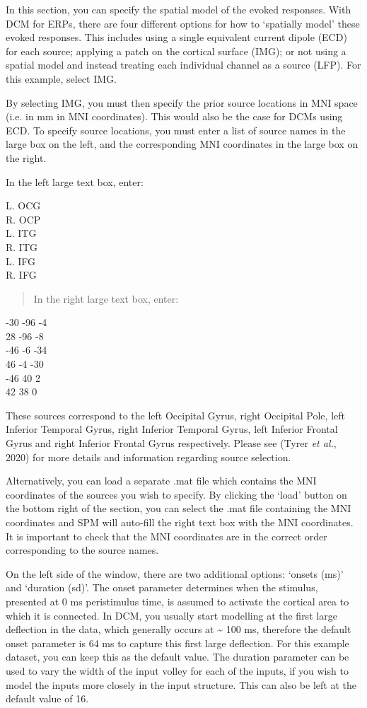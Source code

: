 In this section, you can specify the spatial model of the evoked
responses. With DCM for ERPs, there are four different options for how
to `spatially model' these evoked responses. This includes using a
single equivalent current dipole (ECD) for each source; applying a patch
on the cortical surface (IMG); or not using a spatial model and instead
treating each individual channel as a source (LFP). For this example,
select IMG.

By selecting IMG, you must then specify the prior source locations in
MNI space (i.e. in mm in MNI coordinates). This would also be the case
for DCMs using ECD. To specify source locations, you must enter a list
of source names in the large box on the left, and the corresponding MNI
coordinates in the large box on the right.

In the left large text box, enter:

L. OCG\\
R. OCP\\
L. ITG\\
R. ITG\\
L. IFG\\
R. IFG

\begin{quote}
In the right large text box, enter:
\end{quote}

-30 -96 -4\\
28 -96 -8\\
-46 -6 -34\\
46 -4 -30\\
-46 40 2\\
42 38 0

These sources correspond to the left Occipital Gyrus, right Occipital
Pole, left Inferior Temporal Gyrus, right Inferior Temporal Gyrus, left
Inferior Frontal Gyrus and right Inferior Frontal Gyrus respectively.
Please see (Tyrer \emph{et al.}, 2020) for more details and information
regarding source selection.

Alternatively, you can load a separate .mat file which contains the MNI
coordinates of the sources you wish to specify. By clicking the `load'
button on the bottom right of the section, you can select the .mat file
containing the MNI coordinates and SPM will auto-fill the right text box
with the MNI coordinates. It is important to check that the MNI
coordinates are in the correct order corresponding to the source names.

On the left side of the window, there are two additional options:
`onsets (ms)' and `duration (sd)'. The onset parameter determines when
the stimulus, presented at 0 ms peristimulus time, is assumed to
activate the cortical area to which it is connected. In DCM, you usually
start modelling at the first large deflection in the data, which
generally occurs at \textasciitilde{} 100 ms, therefore the default
onset parameter is 64 ms to capture this first large deflection. For
this example dataset, you can keep this as the default value. The
duration parameter can be used to vary the width of the input volley for
each of the inputs, if you wish to model the inputs more closely in the
input structure. This can also be left at the default value of 16.

